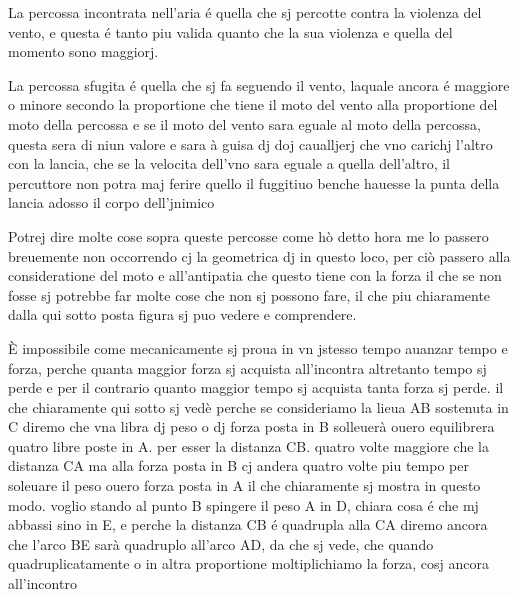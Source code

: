\documentclass[11pt,a4paper]{article}
\begin{document}

La percossa incontrata nell'aria é quella che sj percotte contra la violenza del vento, e questa é tanto piu valida quanto che la sua violenza e quella del momento sono maggiorj.

La percossa sfugita é quella che sj fa seguendo il vento, laquale ancora é maggiore o minore secondo la proportione che tiene il moto del vento alla proportione del moto della percossa e se il moto del vento sara eguale al moto della percossa, questa sera di niun valore e sara à guisa dj doj caualljerj che vno carichj l'altro con la lancia, che se la velocita dell'vno sara eguale a quella dell'altro, il percuttore non potra maj ferire quello il fuggitiuo benche hauesse la punta della lancia adosso il corpo dell'jnimico

Potrej dire molte cose sopra queste percosse come hò detto hora me lo passero breuemente non occorrendo cj la  geometrica dj  in questo loco, per ciò passero alla consideratione del moto e all'antipatia che questo tiene con la forza il che se non fosse sj potrebbe far molte cose che non sj possono fare, il che piu chiaramente dalla qui sotto posta figura sj puo vedere e comprendere.

È impossibile come mecanicamente sj proua in vn jstesso tempo auanzar tempo e forza, perche quanta maggior forza sj acquista all'incontra altretanto tempo sj perde e per il contrario quanto maggior tempo sj acquista tanta forza sj perde. il che chiaramente qui sotto sj vedè perche se consideriamo la lieua AB sostenuta in C diremo che vna libra dj peso o dj forza posta in B solleuerà ouero equilibrera quatro libre poste in A. per esser la distanza CB. quatro volte maggiore che la distanza CA ma alla forza posta in B cj andera quatro volte piu tempo per soleuare il peso ouero forza posta in A il che chiaramente sj mostra in questo modo. voglio stando al punto B spingere il peso A in D, chiara cosa é che mj abbassi sino in E, e perche la distanza CB é quadrupla alla CA diremo ancora che l'arco BE sarà quadruplo all'arco AD, da che sj vede, che quando quadruplicatamente o in altra proportione moltiplichiamo la forza, cosj ancora all'incontro
\end{document}
